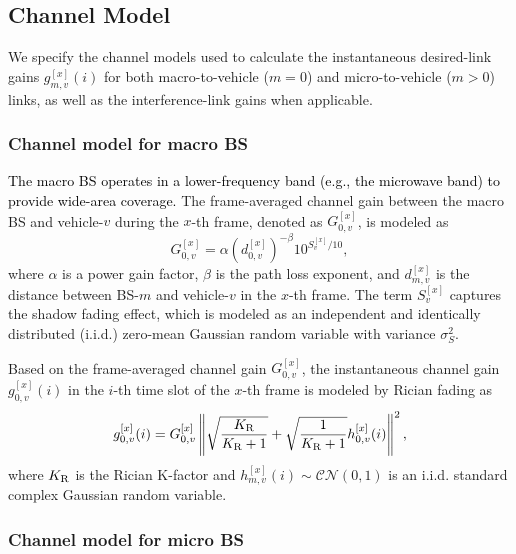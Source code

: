\documentclass[conference, a4paper]{IEEEtran}
\theoremstyle{remark}
\begin{document}
\subsection{Channel Model}

We specify the channel models used to calculate the instantaneous desired-link gains $g_{m,v}^{[x]}(i)$ for both macro-to-vehicle ($m=0$) and micro-to-vehicle ($m>0$) links, as well as the interference-link gains when applicable.

\subsubsection{Channel model for macro BS}

\textcolor{black}{
The macro BS operates in a lower-frequency band (e.g., the microwave band) to provide wide-area coverage. 
}
The frame-averaged channel gain between the macro BS and vehicle-$v$ during the $x$-th frame, denoted as $G_{0,v}^{[x]}$, is modeled as
\begin{equation}
    G_{0,v}^{[x]} = \alpha \left(d_{0,v}^{[x]}\right)^{-\beta} 10^{S_v^{[x]}/10},
    \label{eq:avg channel gain}
\end{equation}
where $\alpha$ is a power gain factor, $\beta$ is the path loss exponent, and $d_{m,v}^{[x]}$ is the distance between BS-$m$ and vehicle-$v$ in the $x$-th frame. The term $S_v^{[x]}$ captures the shadow fading effect, which is modeled as an independent and identically distributed (i.i.d.) zero-mean Gaussian random variable with variance $\sigma_S^2$. 

Based on the frame-averaged channel gain $G_{0,v}^{[x]}$, the instantaneous channel gain $g_{0,v}^{[x]}(i)$ in the $i$-th time slot of the $x$-th frame is modeled by Rician fading as
\begin{equation}
    g_{0,v}^{[x]}(i) = G_{0,v}^{[x]}\left\|\sqrt{\frac{K_{\rm R}}{K_{\rm R}+1}} + \sqrt{\frac{1}{K_{\rm R}+1}} h_{0,v}^{[x]}(i)\right\|^2,
    \label{eq:instant channel condition}
\end{equation}
where $K_{\rm R}$ is the Rician K-factor and $h_{m,v}^{[x]}(i) \sim \mathcal{CN}\left(0,1\right)$ is an i.i.d. standard complex Gaussian random variable. 

\subsubsection{Channel model for micro BS}
\label{sec:micro_channel_model}
\end{document}
